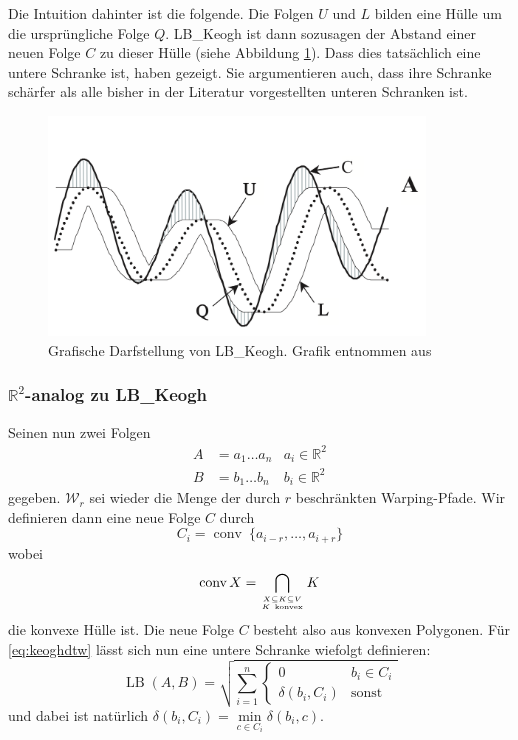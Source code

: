 Die Intuition dahinter ist die folgende. Die Folgen $U$ und $L$ bilden eine Hülle um die ursprüngliche Folge $Q$. LB\_Keogh ist dann sozusagen der Abstand einer neuen Folge $C$ zu dieser Hülle (siehe Abbildung \ref{fig:lb_keogh}). Dass dies tatsächlich eine untere Schranke ist, haben \citet{Keogh:2005p7751} gezeigt. Sie argumentieren auch, dass ihre Schranke schärfer als alle bisher in der Literatur vorgestellten unteren Schranken ist.

\begin{figure}
  \centering \includegraphics[width=10cm]{figures/lb-keogh.png}
  \caption{Grafische Darfstellung von LB\_Keogh. Grafik entnommen aus \cite{Keogh:2005p7751}}
  \label{fig:lb_keogh}
\end{figure}

\subsubsection{\(\mathbb{R}^2\)-analog zu LB\_Keogh}
\label{subs:lb_keogh_analog}

Seinen nun zwei Folgen
\begin{align}
  A &= a_1 \dots a_n  & a_i \in \mathbb{R}^2 \\
  B &= b_1 \dots b_n  & b_i \in \mathbb{R}^2
\end{align}
gegeben.
\( \mathcal{W}_r \) sei wieder die Menge der durch \(r\) beschränkten Warping-Pfade. Wir definieren dann eine neue Folge $C$ durch
\begin{equation}
  C_i = \operatorname{conv} ~\{ a_{i-r}, \dots, a_{i+r} \}
\end{equation}
wobei
\[
  \operatorname{conv} X = \bigcap_{X\subseteq K \subseteq V \atop K\ \mathrm{konvex}} K
\]
die konvexe Hülle ist. Die neue Folge $C$ besteht also aus konvexen Polygonen. Für \ref{eq:keoghdtw} lässt sich nun eine untere Schranke wiefolgt definieren:
\begin{equation}
  \label{eq:lbkeoghanalog}
  \operatorname{LB}(A,B) = \sqrt{\sum_{i=1}^n
  \begin{cases}
    0 & b_i \in C_i \\
    \delta(b_i, C_i) & \text{sonst}
  \end{cases}
  }
\end{equation}
und dabei ist natürlich \( \delta(b_i, C_i) = \min\limits_{c \in C_i} \delta(b_i, c) \).

